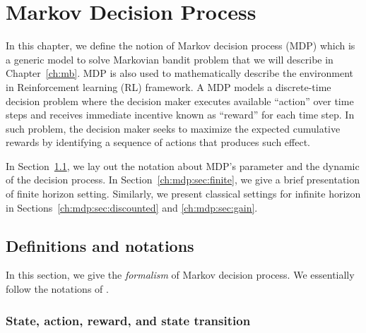 \begingroup

\let\clearpage\relax

\chapter{Markov Decision Process}
\label{ch:mdp}


In this chapter, we define the notion of Markov decision process (MDP) which is a generic model to solve Markovian bandit problem that we will describe in Chapter~\ref{ch:mb}.
MDP is also used to mathematically describe the environment in Reinforcement learning (RL) framework.
A MDP models a discrete-time decision problem where the decision maker executes available ``action'' over time steps and receives immediate incentive known as ``reward'' for each time step.
In such problem, the decision maker seeks to maximize the expected cumulative rewards by identifying a sequence of actions that produces such effect.

In Section~\ref{ch:mdp:sec:defn}, we lay out the notation about MDP's parameter and the dynamic of the decision process.
In Section~\ref{ch:mdp:sec:finite}, we give a brief presentation of finite horizon setting.
Similarly, we present classical settings for infinite horizon in Sections~\ref{ch:mdp:sec:discounted} and \ref{ch:mdp:sec:gain}.


\section{Definitions and notations}
\label{ch:mdp:sec:defn}

In this section, we give the \emph{formalism} of Markov decision process. %
We essentially follow the notations of \cite{puterman2014markov}.

\subsection{State, action, reward, and state transition}

